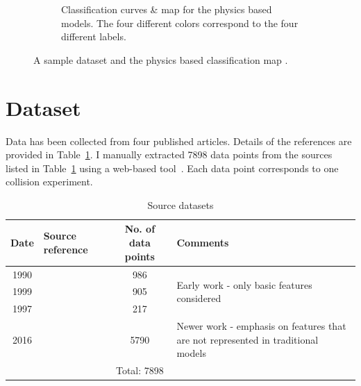 \documentclass{article}
\begin{document}
\begin{figure}[h!]
\begin{subfigure}[b]{0.45\textwidth}
        \caption{Classification curves \& map for the physics based models. The four different colors correspond to the four different labels.}
        \label{fig:regime}
    \end{subfigure}
    \caption{A sample dataset \cite{munnannur2007new} and the physics based classification map \cite{evaluating_collision}.}
    \label{fig:munnannur}
\end{figure}

\clearpage
\section{Dataset}


Data has been collected from four published articles. Details of the references are provided in Table~\ref{tab:data}. I manually extracted 7898 data points from the sources listed in Table~\ref{tab:data} using a web-based tool~\cite{rohatgi2011webplotdigitizer}. Each data point corresponds to one collision experiment.

\begin{table}[h]
  \caption{Source datasets}
  \label{tab:data}
  \centering
  \begin{tabular}{c l c p{5cm}}
    \toprule
    Date  & Source reference      				& No. of data points  & Comments\\
    \midrule
    1990 & \citet{ashgriz1990coalescence}     		& 986   &  \multirow{3}{5cm}{Early work - only basic features considered} \\
    1999 & \citet{estrade1999experimental} 		& 905   & \\ 
    1997 & \citet{qian1997regimes}    			& 217   & \\
    2016 & \citet{sommerfeld2016modelling}  		& 5790 & Newer work - emphasis on features that are not represented in traditional models\\
    \cmidrule(r){3-3}
             & 									& Total: 7898 & \\
    \bottomrule
  \end{tabular}
\end{table}
\end{document}
